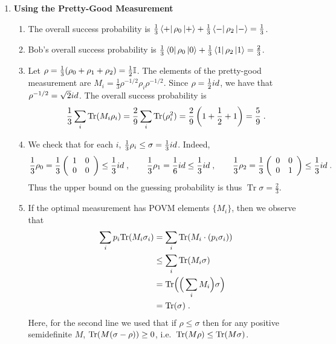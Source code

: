 \documentclass[12pt]{article}
\begin{document}
\begin{enumerate}
\item {\bf Using the Pretty-Good Measurement}

\begin{enumerate}
\item The overall success probability is $\frac13 \bra{+} \rho _0 \ket{+}  + \frac13 \bra{-} \rho _2 \ket{-}  = \frac13$.

\item Bob's overall success probability is $\frac13\bra{0} \rho _0 \ket{0}  + \frac13\bra{1} \rho_2 \ket{1}  = \frac23$.

\item Let $\rho=\frac{1}{3}(\rho_0+\rho_1+\rho_2) = \frac{1}{2}\mathbb{I}$. The elements of the pretty-good measurement are $M_ i = \frac13\rho ^{-1/2}\rho_i\rho ^{-1/2}$. Since $\rho = \frac{1}{2}id$, we have that $\rho ^{-1/2} = \sqrt{2}id$. The overall success probability is 
\[ \frac{1}{3}\sum_i \mathrm{Tr}(M_i\rho_i) = \frac{2}{9} \sum_i \mathrm{Tr}(\rho _ i^2) = \frac{2}{9}\left(1 + \frac{1}{2} + 1\right) = \frac{5}{9}\;.\]

\item We check that for each $i$, $\frac13 \rho _ i \leq \sigma = \frac13id$. Indeed,
\[\frac13\rho _0 = \frac13\left( \begin{array}{cc}1&  0 \\ 0 & 0 \end{array} \right) \leq \frac13id\;,\qquad \frac13\rho _1 =\frac16id\leq \frac13id\;,\qquad
\frac13\rho _2 = \frac13\left( \begin{array}{cc}0&  0 \\ 0 & 1 \end{array} \right) \leq \frac13id\;.\]
Thus the upper bound on the guessing probability is thus $\operatorname {Tr}\sigma = \frac23$.

\item If the optimal measurement has POVM elements $\{M_i\}$, then we observe that 
\begin{align*}
\sum_i p_i  \mathrm{Tr}(M_i \sigma_i) &= \sum_i  \mathrm{Tr}( M_i \cdot (p_i\sigma_i))\\
&\leq \sum_i \mathrm{Tr}(M_i\sigma)\\
&= \mathrm{Tr}\Big(\Big(\sum_i M_i\Big)\sigma\Big)\\
&= \mathrm{Tr}(\sigma)\;.
\end{align*}
Here, for the second line we used that if $\rho\leq \sigma$ then for any positive semidefinite $M$, $\mathrm{Tr}(M(\sigma-\rho))\geq 0$, i.e.\ $\mathrm{Tr}(M\rho)\leq \mathrm{Tr}(M\sigma)$. 
\end{enumerate}


\end{enumerate}
\end{document}
